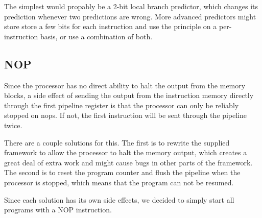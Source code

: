 The simplest would propably be a 2-bit local branch predictor, which changes its prediction whenever two predictions are wrong.
More advanced predictors might store store a few bits for each instruction and use the principle on a per-instruction basis, or use a combination of both.

\subsection{NOP}

Since the processor has no direct ability to halt the output from the memory blocks, a side effect of sending the output from the instruction memory directly through the first pipeline register is that the processor can only be reliably stopped on nops.
If not, the first instruction will be sent through the pipeline twice.

There are a couple solutions for this.
The first is to rewrite the supplied framework to allow the processor to halt the memory output, which creates a great deal of extra work and might cause bugs in other parts of the framework.
The second is to reset the program counter and flush the pipeline when the processor is stopped, which means that the program can not be resumed.

Since each solution has its own side effects, we decided to simply start all
programs with a NOP instruction.

